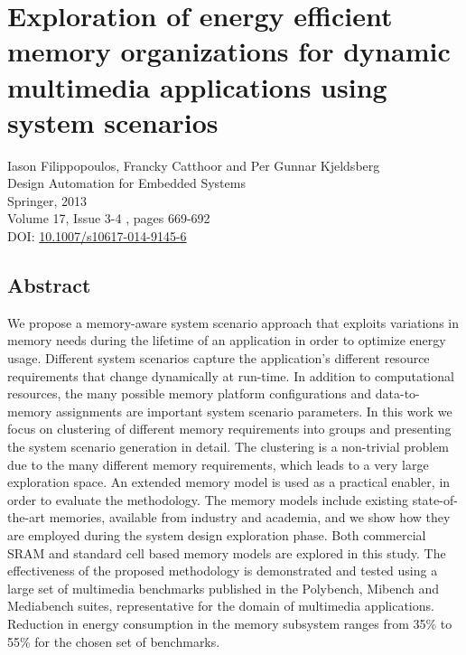 \chapter{Exploration of energy efficient memory organizations for dynamic multimedia applications using system scenarios}
\label{DAES}

\begin{center}
Iason Filippopoulos, Francky Catthoor and Per Gunnar Kjeldsberg
\\
Design Automation for Embedded Systems
\\
Springer, 2013
\\
Volume 17, Issue 3-4 , pages 669-692
\\
DOI: 
\href{http://dx.doi.org/10.1007/s10617-014-9145-6 }{10.1007/s10617-014-9145-6 }
\end{center}
\afterpage{\null\newpage}
\newpage

\vspace*{\fill}
\section*{\hspace*{\fill} Abstract \hspace*{\fill}}
We propose a memory-aware system scenario approach that exploits variations in memory needs during the lifetime of an application in order to optimize energy usage. 
Different system scenarios capture the application's different resource requirements that change dynamically at run-time. 
In addition to computational resources, the many possible memory platform configurations and data-to-memory assignments are important system scenario parameters. 
In this work we focus on clustering of different memory requirements into groups and presenting the system scenario generation in detail.
The clustering is a non-trivial problem due to the many different memory requirements, which leads to a very large exploration space.
An extended memory model is used as a practical enabler, in order to evaluate the methodology. 
The memory models include existing state-of-the-art memories, available from industry and academia, and we show how they are employed during the system design exploration phase. 
Both commercial SRAM and standard cell based memory models are explored in this study. 
The effectiveness of the proposed methodology is demonstrated and tested using a large set of multimedia benchmarks published in the Polybench, Mibench and Mediabench suites,
representative for the domain of multimedia applications.
Reduction in energy consumption in the memory subsystem ranges from 35\% to 55\% for the chosen set of benchmarks.
\vspace*{\fill}
\afterpage{\null\newpage}
\newpage

